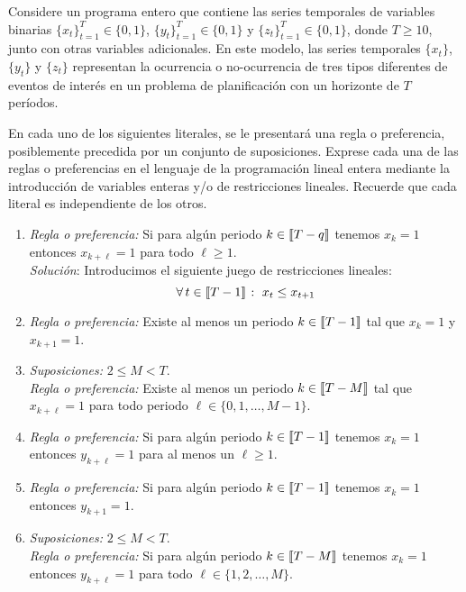 \documentclass[ a4paper, twoside, 11pt]{article}
\begin{document}
\begin{problem}
Considere un programa entero que contiene las series temporales de variables binarias $\{x_t\}_{t=1}^T \in \{ 0, 1 \}$, $\{y_t\}_{t=1}^T \in \{ 0, 1 \}$ y $\{z_t\}_{t=1}^T \in \{ 0, 1 \}$, donde $T \geq 10$, junto con otras variables adicionales. En este modelo, las series temporales $\{x_t\}$, $\{y_t\}$ y $\{z_t\}$ representan la ocurrencia o no-ocurrencia de tres tipos diferentes de eventos de inter\'es en un problema de planificaci\'on con un horizonte de $T$ per\'iodos. 

En cada uno de los siguientes literales, se le presentar\'a una regla o preferencia, posiblemente precedida por un conjunto de suposiciones. Exprese cada una de las reglas o preferencias en el lenguaje de la programaci\'on lineal entera mediante la introducci\'on de variables enteras y/o de restricciones lineales. Recuerde que cada literal es independiente de los otros. 
\begin{enumerate}[label=\alph*)]
\item \emph{Regla o preferencia:} Si para alg\'un periodo $k \in \llbracket T-q \rrbracket$ tenemos $x_k = 1$ entonces $x_{k+\ell} = 1$ para todo $\ell \geq 1$. \\[1ex]
\emph{Soluci\'on}: Introducimos el siguiente juego de restricciones lineales: 
\[
\forall \, t \in \llbracket T-1 \rrbracket \; \colon \; x_t \leq x_{t+1}
\]

\item \emph{Regla o preferencia:} Existe al menos un periodo $k \in \llbracket T-1 \rrbracket$ tal que $x_k = 1$ y $x_{k+1} = 1$. 

\item \emph{Suposiciones:} $2 \leq M < T$. \\
\emph{Regla o preferencia:} Existe al menos un periodo $k \in \llbracket T-M \rrbracket$ tal que $x_{k+\ell} = 1$ para todo periodo $\ell \in \{ 0, 1, \dots, M-1 \}$. 

\item \emph{Regla o preferencia:} Si para alg\'un periodo $k \in \llbracket T-1 \rrbracket$ tenemos $x_k = 1$ entonces $y_{k+\ell} = 1$ para al menos un $\ell \geq 1$. 

\item \emph{Regla o preferencia:} Si para alg\'un periodo $k \in \llbracket T-1 \rrbracket$ tenemos $x_k = 1$ entonces $y_{k+1} = 1$. 

\item \emph{Suposiciones:} $2 \leq M < T$. \\
\emph{Regla o preferencia:} Si para alg\'un periodo $k \in \llbracket T-M \rrbracket$ tenemos $x_k = 1$ entonces $y_{k+\ell} = 1$ para todo $\ell \in \{ 1, 2, \dots, M \}$. 


\end{enumerate}
\end{problem}
\end{document}
